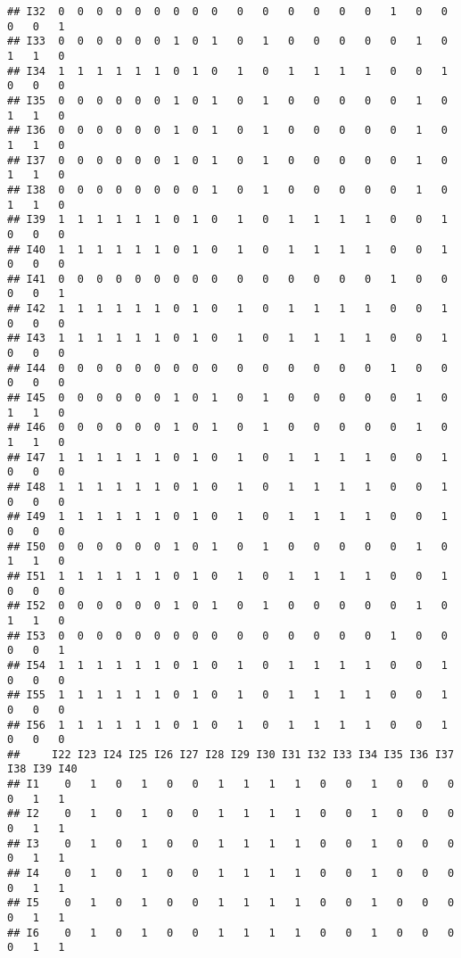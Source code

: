 \documentclass[
]{article}
\begin{document}
\begin{verbatim}
## I32  0  0  0  0  0  0  0  0  0   0   0   0   0   0   0   1   0   0   0   0   1
## I33  0  0  0  0  0  0  1  0  1   0   1   0   0   0   0   0   1   0   1   1   0
## I34  1  1  1  1  1  1  0  1  0   1   0   1   1   1   1   0   0   1   0   0   0
## I35  0  0  0  0  0  0  1  0  1   0   1   0   0   0   0   0   1   0   1   1   0
## I36  0  0  0  0  0  0  1  0  1   0   1   0   0   0   0   0   1   0   1   1   0
## I37  0  0  0  0  0  0  1  0  1   0   1   0   0   0   0   0   1   0   1   1   0
## I38  0  0  0  0  0  0  0  0  1   0   1   0   0   0   0   0   1   0   1   1   0
## I39  1  1  1  1  1  1  0  1  0   1   0   1   1   1   1   0   0   1   0   0   0
## I40  1  1  1  1  1  1  0  1  0   1   0   1   1   1   1   0   0   1   0   0   0
## I41  0  0  0  0  0  0  0  0  0   0   0   0   0   0   0   1   0   0   0   0   1
## I42  1  1  1  1  1  1  0  1  0   1   0   1   1   1   1   0   0   1   0   0   0
## I43  1  1  1  1  1  1  0  1  0   1   0   1   1   1   1   0   0   1   0   0   0
## I44  0  0  0  0  0  0  0  0  0   0   0   0   0   0   0   1   0   0   0   0   0
## I45  0  0  0  0  0  0  1  0  1   0   1   0   0   0   0   0   1   0   1   1   0
## I46  0  0  0  0  0  0  1  0  1   0   1   0   0   0   0   0   1   0   1   1   0
## I47  1  1  1  1  1  1  0  1  0   1   0   1   1   1   1   0   0   1   0   0   0
## I48  1  1  1  1  1  1  0  1  0   1   0   1   1   1   1   0   0   1   0   0   0
## I49  1  1  1  1  1  1  0  1  0   1   0   1   1   1   1   0   0   1   0   0   0
## I50  0  0  0  0  0  0  1  0  1   0   1   0   0   0   0   0   1   0   1   1   0
## I51  1  1  1  1  1  1  0  1  0   1   0   1   1   1   1   0   0   1   0   0   0
## I52  0  0  0  0  0  0  1  0  1   0   1   0   0   0   0   0   1   0   1   1   0
## I53  0  0  0  0  0  0  0  0  0   0   0   0   0   0   0   1   0   0   0   0   1
## I54  1  1  1  1  1  1  0  1  0   1   0   1   1   1   1   0   0   1   0   0   0
## I55  1  1  1  1  1  1  0  1  0   1   0   1   1   1   1   0   0   1   0   0   0
## I56  1  1  1  1  1  1  0  1  0   1   0   1   1   1   1   0   0   1   0   0   0
##     I22 I23 I24 I25 I26 I27 I28 I29 I30 I31 I32 I33 I34 I35 I36 I37 I38 I39 I40
## I1    0   1   0   1   0   0   1   1   1   1   0   0   1   0   0   0   0   1   1
## I2    0   1   0   1   0   0   1   1   1   1   0   0   1   0   0   0   0   1   1
## I3    0   1   0   1   0   0   1   1   1   1   0   0   1   0   0   0   0   1   1
## I4    0   1   0   1   0   0   1   1   1   1   0   0   1   0   0   0   0   1   1
## I5    0   1   0   1   0   0   1   1   1   1   0   0   1   0   0   0   0   1   1
## I6    0   1   0   1   0   0   1   1   1   1   0   0   1   0   0   0   0   1   1

\end{verbatim}
\end{document}
